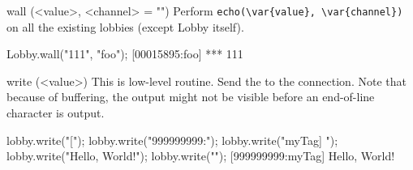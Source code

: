 \begin{urbiscriptapi}
\item[wall](<value>, <channel> = "")%
  Perform \lstinline|echo(\var{value}, \var{channel})| on all the
  existing lobbies (except Lobby itself).
\begin{urbiscript}[firstnumber=1]
Lobby.wall("111", "foo");
[00015895:foo] *** 111
\end{urbiscript}

\item[write](<value>)%
  This is low-level routine.  Send the  
  to the connection.  Note that because of buffering, the output might
  not be visible before an end-of-line character is output.
\begin{urbiscript}
lobby.write("[");
lobby.write("999999999:");
lobby.write("myTag] ");
lobby.write("Hello, World!");
lobby.write("\n");
[999999999:myTag] Hello, World!
\end{urbiscript}
\end{urbiscriptapi}

